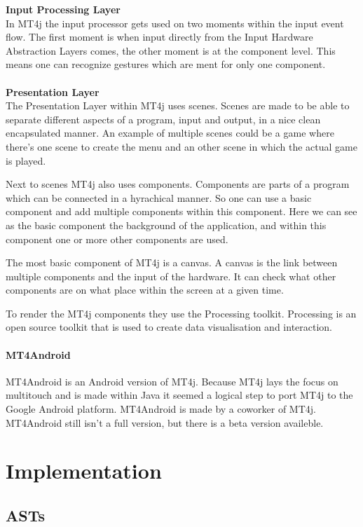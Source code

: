 \documentclass[a4paper,12pt]{report}
\begin{document}
\textbf{Input Processing Layer}
\\
In MT4j the input processor gets used on two moments within the input event flow. The first moment is when input directly from the Input Hardware Abstraction Layers comes, the other moment
is at the component level. This means one can recognize gestures which are ment for only one component.
\\
\\
\textbf{Presentation Layer}
\\
The Presentation Layer within MT4j uses scenes. Scenes are made to be able to separate different aspects of a program, input and output, in a nice clean encapsulated 
manner. An example of multiple scenes could be a game where there's one scene to create the menu and an other scene in which the actual game is played.

Next to scenes MT4j also uses components. Components are parts of a program which can be connected in a hyrachical manner. So one can use a basic component and add multiple
components within this component. Here we can see as the basic component the background of the application, and within this component one or more other components are used.

The most basic component of MT4j is a canvas. A canvas is the link between multiple components and the input of the hardware. It can check what other components are on
what place within the screen at a given time.

To render the MT4j components they use the Processing toolkit. Processing is an open source toolkit that is used to create data visualisation and interaction.

\subsubsection{MT4Android}
MT4Android is an Android version of MT4j. Because MT4j lays the focus on multitouch and is made within Java it seemed a logical step to port MT4j to the Google Android 
platform. MT4Android is made by a coworker of MT4j. MT4Android still isn't a full version, but there is a beta version availeble.


\chapter{Implementation}
\section{ASTs}
\end{document}
